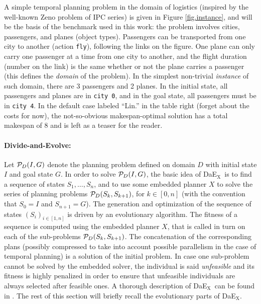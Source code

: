 \documentclass{llncs}
\def\DAEX{{\sc DaE$_{\text{X}}$}}
\def\ZENO{{\sc Zeno}}
\begin{document}
A simple temporal planning problem in the domain of logistics (inspired by the well-known {\ZENO} problem of IPC series) is given in Figure \ref{fig.instance}, and will be the basis of the benchmark used in this work: the problem involves cities, passengers, and planes (object types). Passengers can be transported from one city to another (action {\tt fly}), following the links on the figure. One plane can only carry one passenger at a time from one city to another, and the flight duration (number on the link) is the same whether or not the plane carries a passenger (this defines the {\em domain} of the problem). In the simplest non-trivial {\em instance} of such domain, there are 3 passengers and 2 planes. In the initial state, all passengers and planes are in {\tt city 0}, and in the goal state, all passengers must be in {\tt city 4}. In the default case labeled ``Lin.'' in the table right (forget about the costs for now), the not-so-obvious makespan-optimal solution has a total makespan of 8 and is left 
as a teaser for the reader.

\paragraph{Divide-and-Evolve:} Let ${\cal P}_D(I,G)$ denote the planning problem defined on domain $D$ with initial state $I$ and goal state $G$. In order to solve  ${\cal P}_D(I,G)$, the basic idea of \DAEX\ is to find a sequence of states $S_1, \ldots, S_n$, and to use some embedded planner $X$ to solve the series of planning problems ${\cal P}_D(S_{k},S_{k+1})$, for $k \in [0,n]$ (with the convention that $S_0 = I$ and $S_{n+1} = G$).
The generation and optimization of the sequence of states $(S_i)_{i \in [1,n]}$  is driven by an evolutionary algorithm. The fitness of a sequence is computed using the embedded planner $X$, that is called in turn on each of the sub-problems ${\cal P}_D(S_{k},S_{k+1})$. The concatenation of the corresponding plans (possibly compressed to take into account possible parallelism in the case of temporal planning) is a solution of the initial problem. In case one sub-problem cannot be solved by the embedded solver, the individual is said {\em unfeasible} and its fitness is highly penalized in order to ensure that unfeasible individuals are always selected after feasible ones. A thorough description of \DAEX\ can be found in \cite{Bibai2010}. 
The rest of this section will briefly recall the evolutionary parts of \DAEX.
\end{document}
